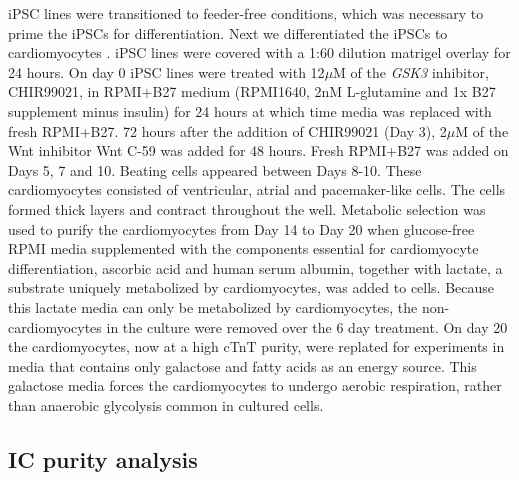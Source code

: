 \documentclass{article}
\begin{document}
iPSC lines were transitioned to feeder-free conditions, which was necessary to prime the iPSCs for differentiation. Next we differentiated the iPSCs to cardiomyocytes  \cite{Lian2013, Burridge2014}. iPSC lines were covered with a 1:60 dilution matrigel overlay for 24 hours. On day 0 iPSC lines were treated with 12$\mu$M of the \emph{GSK3} inhibitor, CHIR99021, in RPMI+B27 medium (RPMI1640, 2nM L-glutamine and 1x B27 supplement minus insulin) for 24 hours at which time media was replaced with fresh RPMI+B27. 72 hours after the addition of CHIR99021 (Day 3), 2$\mu$M of the Wnt inhibitor Wnt C-59 was added for 48 hours.  Fresh RPMI+B27 was added on Days 5, 7 and 10. Beating cells appeared between Days 8-10. These cardiomyocytes consisted of ventricular, atrial and pacemaker-like cells. The cells formed thick layers and contract throughout the well. Metabolic selection was used to purify the cardiomyocytes\cite{Tohyama2013-hb} from Day 14 to Day 20 when glucose-free RPMI media supplemented with the components essential for cardiomyocyte differentiation\cite{Burridge2014}, ascorbic acid and human serum albumin, together with lactate, a substrate uniquely metabolized by cardiomyocytes, was added to cells. Because this lactate media can only be metabolized by cardiomyocytes, the non-cardiomyocytes in the culture were removed over the 6 day treatment. On day 20 the cardiomyocytes, now at a high cTnT purity, were replated for experiments in media that contains only galactose and fatty acids as an energy source. This galactose media forces the cardiomyocytes to undergo aerobic respiration, rather than anaerobic glycolysis common in cultured cells.

\subsection*{IC purity analysis}
\end{document}
